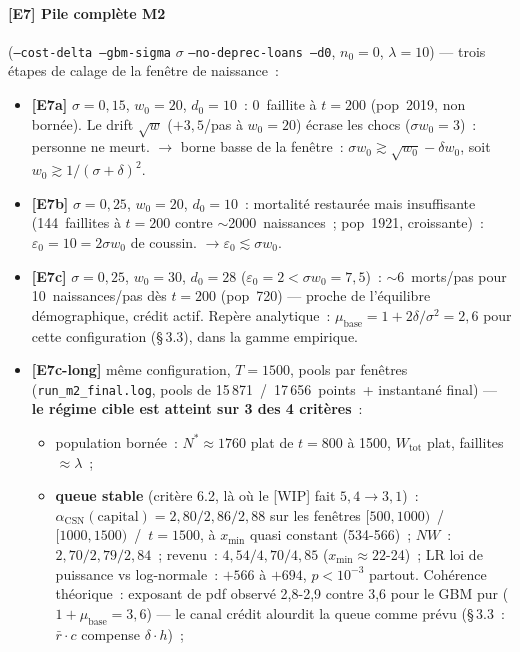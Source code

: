 \documentclass[11pt,a4paper]{article}
\newcommand{\NW}{\mathit{NW}}
\begin{document}
\paragraph{[E7] Pile complète M2} (\texttt{--cost-delta --gbm-sigma} $\sigma$ \texttt{--no-deprec-loans --d0}, $n_0=0$, $\lambda=10$) --- trois étapes de calage de la fenêtre de naissance~:

\begin{itemize}
  \item \textbf{[E7a]} $\sigma=0{,}15$, $w_0=20$, $d_0=10$~: 0~faillite à $t=200$ (pop~2019, non bornée). Le drift $\sqrt{w}$ ($+3{,}5$/pas à $w_0=20$) écrase les chocs ($\sigma w_0=3$)~: personne ne meurt. $\to$ borne basse de la fenêtre~: $\sigma w_0\gtrsim\sqrt{w_0}-\delta w_0$, soit $w_0\gtrsim 1/(\sigma+\delta)^2$.
  \item \textbf{[E7b]} $\sigma=0{,}25$, $w_0=20$, $d_0=10$~: mortalité restaurée mais insuffisante (144~faillites à $t=200$ contre $\sim$2000~naissances~; pop~1921, croissante)~: $\varepsilon_0=10=2\sigma w_0$ de coussin. $\to \varepsilon_0\lesssim\sigma w_0$.
  \item \textbf{[E7c]} $\sigma=0{,}25$, $w_0=30$, $d_0=28$ ($\varepsilon_0=2<\sigma w_0=7{,}5$)~: $\sim$6~morts/pas pour 10~naissances/pas dès $t=200$ (pop~720) --- proche de l'équilibre démographique, crédit actif. Repère analytique~: $\mu_{\mathrm{base}}=1+2\delta/\sigma^2=2{,}6$ pour cette configuration (\S\,3.3), dans la gamme empirique.
  \item \textbf{[E7c-long]} même configuration, $T=1500$, pools par fenêtres (\texttt{run_m2_final.log}, pools de 15\,871~/~17\,656~points~+ instantané final) --- \textbf{le régime cible est atteint sur 3 des 4 critères}~:
  \begin{itemize}
    \item population bornée~: $N^*\approx 1760$ plat de $t=800$ à 1500, $W_{\mathrm{tot}}$ plat, faillites $\approx\lambda$~;
    \item \textbf{queue stable} (critère 6.2, là où le [WIP] fait $5{,}4\to 3{,}1$)~: $\alpha_{\mathrm{CSN}}(\text{capital})=2{,}80/2{,}86/2{,}88$ sur les fenêtres $[500,1000)$~/~$[1000,1500)$~/~$t=1500$, à $x_{\min}$ quasi constant (534-566)~; $\NW$~: $2{,}70/2{,}79/2{,}84$~; revenu~: $4{,}54/4{,}70/4{,}85$ ($x_{\min}\approx 22$-24)~; LR loi de puissance vs log-normale~: $+566$ à $+694$, $p<10^{-3}$ partout. Cohérence théorique~: exposant de pdf observé 2,8-2,9 contre 3,6 pour le GBM pur ($1+\mu_{\mathrm{base}}=3{,}6$) --- le canal crédit alourdit la queue comme prévu (\S\,3.3~: $\bar r\cdot c$ compense $\delta\cdot h$)~;

\end{itemize}
\end{itemize}
\end{document}
